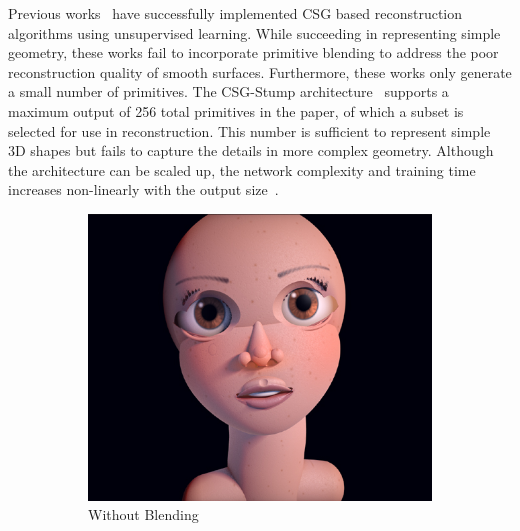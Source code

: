 Previous works~\cite{Sharma2018, Kania2020, Ren2021} have successfully implemented CSG based reconstruction algorithms using unsupervised learning. While succeeding in representing simple geometry, these works fail to incorporate primitive blending to address the poor reconstruction quality of smooth surfaces. Furthermore, these works only generate a small number of primitives. The CSG-Stump architecture~\cite{Ren2021} supports a maximum output of 256 total primitives in the paper, of which a subset is selected for use in reconstruction. This number is sufficient to represent simple 3D shapes but fails to capture the details in more complex geometry. Although the architecture can be scaled up, the network complexity and training time increases non-linearly with the output size~\cite{Ren2021}.

\begin{figure}[!b]
	\centering
	\begin{subfigure}[t]{0.45\textwidth}
		\centering
		\includegraphics[width=\textwidth]{Images/Face without blending}
		\caption{Without Blending}
	\end{subfigure}
	\hfill
	\begin{subfigure}[t]{0.45\textwidth}
		\centering

\end{subfigure}
\end{figure}
